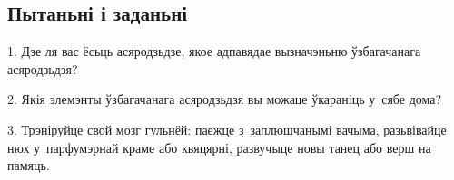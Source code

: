 \subsection*{Пытаньні і заданьні}

1. Дзе ля вас ёсьць асяродзьдзе, якое адпавядае вызначэньню ўзбагачанага асяродзьдзя?

2. Якія элемэнты ўзбагачанага асяродзьдзя вы можаце ўкараніць у~сябе дома?

3. Трэніруйце свой мозг гульнёй: паежце з~заплюшчанымі вачыма, разьвівайце нюх у~парфумэрнай краме або квяцярні, развучыце новы танец або верш на памяць.

